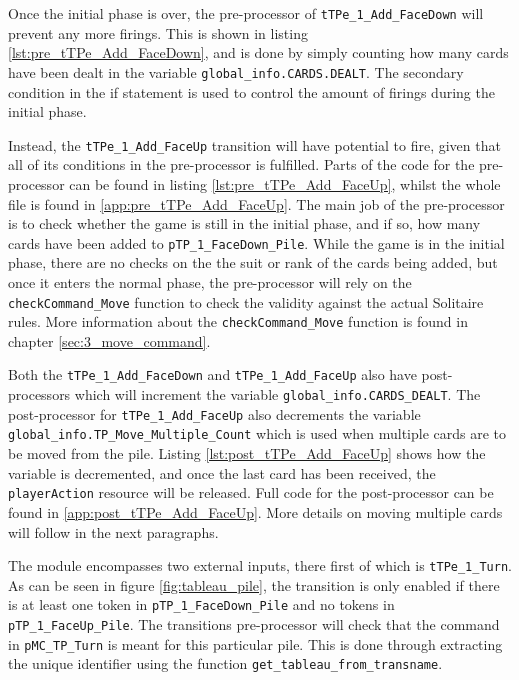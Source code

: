 \documentclass[runningheads,a4paper]{llncs}
\newcommand{\GPenSIM}{../GPenSIM}
\begin{document}
Once the initial phase is over, the pre-processor of \verb!tTPe_1_Add_FaceDown! will prevent any more firings. This is shown in listing \ref{lst:pre_tTPe_Add_FaceDown}, and is done by simply counting how many cards have been dealt in the variable \verb!global_info.CARDS.DEALT!. The secondary condition in the if statement is used to control the amount of firings during the initial phase.


Instead, the \verb!tTPe_1_Add_FaceUp! transition will have potential to fire, given that all of its conditions in the pre-processor is fulfilled. Parts of the code for the pre-processor can be found in listing \ref{lst:pre_tTPe_Add_FaceUp}, whilst the whole file is found in \ref{app:pre_tTPe_Add_FaceUp}. The main job of the pre-processor is to check whether the game is still in the initial phase, and if so, how many cards have been added to \verb!pTP_1_FaceDown_Pile!. While the game is in the initial phase, there are no checks on the the suit or rank of the cards being added, but once it enters the normal phase, the pre-processor will rely on the \verb!checkCommand_Move! function to check the validity against the actual Solitaire rules. More information about the \verb!checkCommand_Move! function is found in chapter \ref{sec:3_move_command}. 


Both the \verb!tTPe_1_Add_FaceDown! and \verb!tTPe_1_Add_FaceUp! also have post-processors which will increment the variable \verb!global_info.CARDS_DEALT!. The post-processor for \verb!tTPe_1_Add_FaceUp! also decrements the variable \\\verb!global_info.TP_Move_Multiple_Count! which is used when multiple cards are to be moved from the pile. Listing \ref{lst:post_tTPe_Add_FaceUp} shows how the variable is decremented, and once the last card has been received, the \verb!playerAction! resource will be released. Full code for the post-processor can be found in \ref{app:post_tTPe_Add_FaceUp}. More details on moving multiple cards will follow in the next paragraphs.


The module encompasses two external inputs, there first of which is \verb!tTPe_1_Turn!. As can be seen in figure \ref{fig:tableau_pile}, the transition is only enabled if there is at least one token in \verb!pTP_1_FaceDown_Pile! and no tokens in \verb!pTP_1_FaceUp_Pile!. The transitions pre-processor will check that the command in \verb!pMC_TP_Turn! is meant for this particular pile. This is done through extracting the unique identifier using the function \verb!get_tableau_from_transname!. \newline
\end{document}

